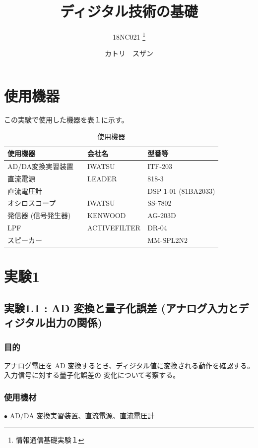 \documentclass[10pt]{article}
\title{ディジタル技術の基礎}
\author{18NC021 \thanks{情報通信基礎実験１}}
\date{カトリ　スザン}
\begin{document}
\begin{titlepage}
	\maketitle
\end{titlepage}

\tableofcontents
\pagebreak

 

\section{使用機器}
この実験で使用した機器を表１に示す。
\begingroup
\setlength{\tabcolsep}{5pt} %
\renewcommand{\arraystretch}{1.5} %
\begin{table}[H]
    \centering
	\caption{使用機器}
	\begin{tabular}{|l|l|l|}
	    \hline
	    使用機器 & 会社名 & 型番等\\[0.5ex]
		\hline\hline
		AD/DA変換実習装置　& IWATSU &ITF-203	 \\ \hline
		直流電源	& LEADER & 818-3\\ \hline
		直流電圧計　　&	 & DSP 1-01 (81BA2033)\\ \hline
        オシロスコープ　& IWATSU &	SS-7802 \\ \hline
        発信器 (信号発生器)　& KENWOOD &	AG-203D \\ \hline
        LPF　& ACTIVEFILTER &	DR-04 \\ \hline
        スピーカー　&  &	MM-SPL2N2 \\ \hline
	\end{tabular}
\end{table} 
\endgroup

\section{実験1}
\subsection{実験1.1 : AD 変換と量子化誤差 (アナログ入力とディジタル出力の関係)}

\subsubsection{目的}
アナログ電圧を AD 変換するとき、ディジタル値に変換される動作を確認する。入力信号に対する量子化誤差の 変化について考察する。
\subsubsection{使用機材}
$\bullet$ AD/DA 変換実習装置、直流電源、直流電圧計
\end{document}

